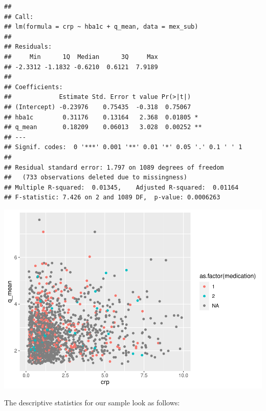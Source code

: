 \documentclass[
  man,floatsintext]{apa6}
\begin{document}
\begin{verbatim}
## 
## Call:
## lm(formula = crp ~ hba1c + q_mean, data = mex_sub)
## 
## Residuals:
##     Min      1Q  Median      3Q     Max 
## -2.3312 -1.1832 -0.6210  0.6121  7.9189 
## 
## Coefficients:
##             Estimate Std. Error t value Pr(>|t|)   
## (Intercept) -0.23976    0.75435  -0.318  0.75067   
## hba1c        0.31176    0.13164   2.368  0.01805 * 
## q_mean       0.18209    0.06013   3.028  0.00252 **
## ---
## Signif. codes:  0 '***' 0.001 '**' 0.01 '*' 0.05 '.' 0.1 ' ' 1
## 
## Residual standard error: 1.797 on 1089 degrees of freedom
##   (733 observations deleted due to missingness)
## Multiple R-squared:  0.01345,    Adjusted R-squared:  0.01164 
## F-statistic: 7.426 on 2 and 1089 DF,  p-value: 0.0006263
\end{verbatim}

\includegraphics{Final_Groupof5_files/figure-latex/unnamed-chunk-10-1.pdf}

The descriptive statistics for our sample look as follows:
\end{document}
